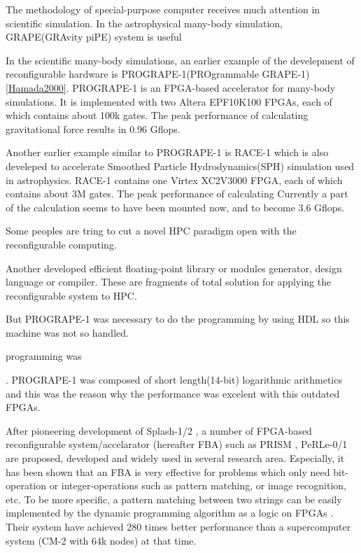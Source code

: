 \documentclass{llncs}
\begin{document}
The methodology of special-purpose computer receives much attention in
scientific simulation. In the astrophysical many-body simulation,
GRAPE(GRAvity piPE) system is useful 


In the scientific many-body simulations, an earlier example
of the develepment of reconfigurable hardware is
PROGRAPE-1(PROgrammable GRAPE-1)\ref{Hamada2000}.  PROGRAPE-1 is an
FPGA-based accelerator for many-body simulations.  It is implemented
with two Altera EPF10K100 FPGAs, each of which contains about 100k
gates.  The peak performance of calculating gravitational force
results in 0.96 Gflops.

Another earlier example similar to PROGRAPE-1 is RACE-1 which is
also develeped to accelerate Smoothed Particle Hydrodynamics(SPH)
simulation used in astrophysics. RACE-1 contains one Virtex XC2V3000 FPGA,
each of which contains about 3M gates. The peak performance of calculating 
Currently a part of the calculation seems to have been mounted now, and to become 3.6
Gflops.


Some peoples are tring to cut a novel HPC paradigm open with the
reconfigurable computing. 


Another
developed efficient floating-point library or modules generator,
design language or compiler. These are fragments of total solution for
applying the reconfigurable system to HPC.




But PROGRAPE-1 was necessary to do the programming by using HDL so this machine was not so handled.

programming was 

.  PROGRAPE-1
was composed of short length(14-bit) logarithmic arithmetics and this
was the reason why the performance was excelent with this outdated
FPGAs.

After pioneering development of Splash-1/2 \cite{Splash},
a number of FPGA-based reconfigurable system/accelarator (hereafter FBA)
such as PRISM \cite{W93}, PeRLe-0/1 \cite{VBRSTB94}
are proposed, developed and widely used in several research area.
Especially, it has been shown that an FBA is very effective for
problems which only need bit-operation or integer-operations
such as pattern matching, or image recognition, etc.
To be more specific, a pattern matching between two strings
can be easily implemented by the dynamic programming algorithm \cite{DP}
as a logic on FPGAs \cite{Splash}.
Their system have achieved 280 times better performance than
a supercomputer system (CM-2 with 64k nodes) at that time.
\end{document}
